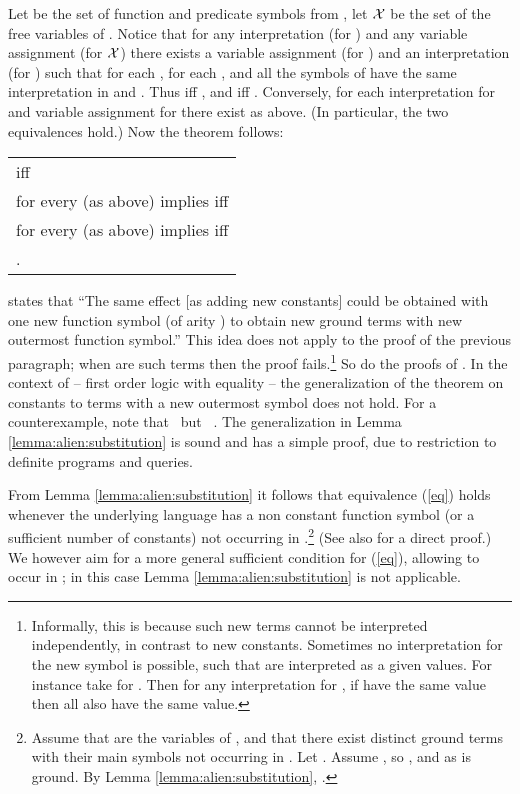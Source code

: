 \documentclass[a4paper]{tlp2}
\newcommand*{\X}{{\ensuremath{\cal X}}\xspace}
\begin{document}
Let  be the set of function and predicate symbols from , let 
\X be the set of the free variables of .
Notice that
for any interpretation  (for ) and any variable assignment 
(for \X)
there exists a variable assignment 
(for )
and an interpretation  
(for ) such that
 for each ,
  for each , and all the symbols
of  have the same interpretation in  and .  
Thus  iff , and 
 iff .
Conversely, for each interpretation  for 
and variable assignment  for 
there exist  as above. (In particular, the two equivalences hold.)
Now the theorem follows:
\smallskip

\begin{tabular}{l}
 iff  \\
for every  (as above)  implies 
iff \\
for every  (as above)  implies
 iff \\
.
\end{tabular}
\smallskip




states that ``The same effect 
[as adding new constants] could be obtained with one new function symbol (of
arity ) to obtain new ground terms with new outermost function symbol.''
This idea does not apply to the proof of the previous paragraph;
when  are such terms then the proof fails.\footnote{Informally, this is because such new terms cannot be interpreted
  independently, in contrast to  new constants.
Sometimes no interpretation for the new symbol  is possible,
  such that   are interpreted as a given  values.
  For instance take  for .
  Then for any interpretation for ,
  if  have the same value then all  also have the same value.
} So do the proofs of  \cite{shoenfield67,HandbookLAILP:FOL}.
In the context of \cite{shoenfield67} -- first order logic with equality -- the
generalization of the theorem on constants to terms with a
new outermost symbol does not hold.
For a counterexample, note that 
 \ but \ 
.
The generalization in Lemma \ref{lemma:alien:substitution} is
sound and has a simple proof, due to restriction to 
definite programs and queries.


From Lemma \ref{lemma:alien:substitution} it follows that equivalence (\ref{eq})
holds whenever the underlying language has a non constant function symbol 
(or a sufficient number of constants) not occurring in .\footnote{Assume that   are the variables of , and that there exist
    distinct ground terms  with their main symbols
not occurring in .
    Let  .
Assume , so , 
    and  as  is ground.
By Lemma \ref{lemma:alien:substitution}, . 
} (See also \cite[Appendix]{drabent.arxiv.coco14} for a direct proof.)
We however aim for a more general sufficient condition for (\ref{eq}),
allowing  to occur in ;
in this case Lemma \ref{lemma:alien:substitution} is not applicable.
\end{document}
